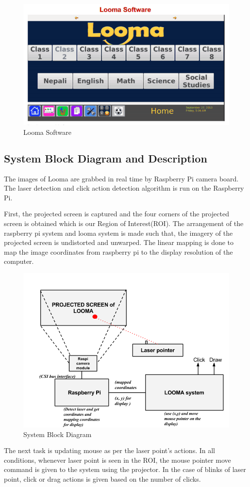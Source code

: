 \documentclass[12pt, a4paper]{article}
\begin{document}
\begin{figure}[htp]
	\centering
		\includegraphics[scale=0.3]{loomasoftware.png}
	\caption{Looma Software}
\label{}
\end{figure}

\subsection{System Block Diagram and Description}
The images of Looma are grabbed in real time by Raspberry Pi camera board. The laser detection and click action detection algorithm is run on the Raspberry Pi.

First, the projected screen is captured and the four corners of the projected screen is obtained which is our Region of Interest(ROI). The arrangement of the raspberry pi system and looma system is made such that, the imagery of the projected screen is undistorted and unwarped. The linear mapping is done to map the image coordinates from raspberry pi to the display resolution of the computer.
\newpage

\begin{figure}[htp]
\centering
\includegraphics[scale=0.6]{proposed_system}
\caption{System Block Diagram}
\label{Block Diagram}
\end{figure}
The next task is updating mouse as per the laser point's actions. In all conditions, whenever laser point is seen in the ROI, the mouse pointer move command is given to the system using the projector. In the case of blinks of laser point, click or drag actions is given based on the number of clicks. 
\end{document}
